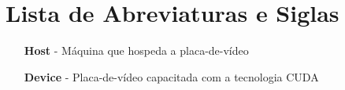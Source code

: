 \chapter*{Lista de Abreviaturas e Siglas}
\begin{itemize}
\item[\textbf{Host}] - Máquina que hospeda a placa-de-vídeo
\item[\textbf{Device}] - Placa-de-vídeo capacitada com a tecnologia CUDA
\end{itemize}
